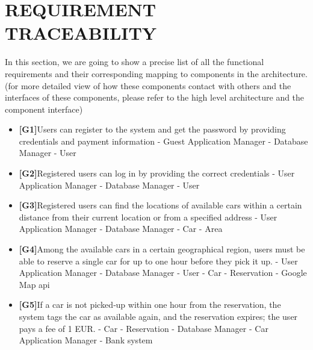 \documentclass{article}
\begin{document}
	\section{REQUIREMENT TRACEABILITY}
	In this section, we are going to show a precise list of all the functional requirements and their corresponding mapping to components in the architecture.(for more detailed view of how these components contact with others and the interfaces of these components, please refer to the high level architecture and the component interface)
	\begin{itemize}
		\item\textbf{[G1]}Users can register to the system and get the password by providing credentials and payment information
		\newline - Guest Application Manager
		\newline - Database Manager
		\newline - User
		
		\item\textbf{[G2]}Registered users can log in by providing the correct credentials
		\newline - User Application Manager
		\newline - Database Manager
		\newline - User
		
		\item\textbf{[G3]}Registered users can find the locations of available cars within a certain distance from their current location or from a specified address
		\newline - User Application Manager
		\newline - Database Manager
		\newline - Car 
		\newline - Area
		
		\item\textbf{[G4]}Among the available cars in a certain geographical region, users must be able to reserve a single car for up to one hour before they pick it up.
		\newline - User Application Manager
		\newline - Database Manager
		\newline - User
		\newline - Car
		\newline - Reservation
		\newline - Google Map api
		
		\item\textbf{[G5]}If a car is not picked‐up within one hour from the reservation, the system tags the car as available again, and the reservation expires; the user pays a fee of 1 EUR.
		\newline - Car
		\newline - Reservation
		\newline - Database Manager
		\newline - Car Application Manager
		\newline - Bank system
		

\end{itemize}
\end{document}
